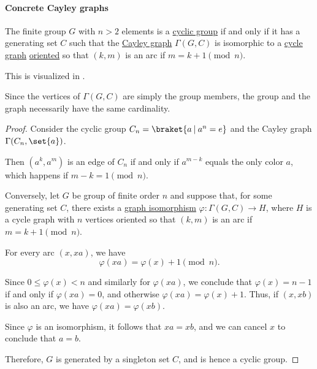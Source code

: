 \paragraph{Concrete Cayley graphs}

\begin{proposition}\label{thm:cayley_graph_of_finite_cyclic_group}
  The finite group \( G \) with \( n > 2 \) elements is a \hyperref[def:cyclic_group]{cyclic group} if and only if it has a generating set \( C \) such that the \hyperref[def:cayley_graph]{Cayley graph} \( \Gamma(G, C) \) is isomorphic to a \hyperref[def:cycle_graph]{cycle graph} \hyperref[def:multigraph_orientation]{oriented} so that \( (k, m) \) is an arc if \( m = k + 1 \pmod n \).
\end{proposition}
\begin{comments}
  \item This is visualized in .
  \item Since the vertices of \( \Gamma(G, C) \) are simply the group members, the group and the graph necessarily have the same cardinality.
\end{comments}
\begin{proof}
  \SufficiencySubProof Consider the cyclic group \( C_n = \braket{ a \given a^n = e } \) and the Cayley graph \( \Gamma(C_n, \set{ a }) \).

  Then \( (a^k, a^m) \) is an edge of \( C_n \) if and only if \( a^{m - k} \) equals the only color \( a \), which happens if \( m - k = 1 \pmod n \).

  \NecessitySubProof Conversely, let \( G \) be group of finite order \( n \) and suppose that, for some generating set \( C \), there exists a \hyperref[def:directed_graph/homomorphism]{graph isomorphism} \( \varphi: \Gamma(G, C) \to H \), where \( H \) is a cycle graph with \( n \) vertices oriented so that \( (k, m) \) is an arc if \( m = k + 1 \pmod n \).

  For every arc \( (x, xa) \), we have
  \begin{equation*}
    \varphi(xa) = \varphi(x) + 1 \pmod n.
  \end{equation*}

  Since \( 0 \leq \varphi(x) < n \) and similarly for \( \varphi(xa) \), we conclude that \( \varphi(x) = n - 1 \) if and only if \( \varphi(xa) = 0 \), and otherwise \( \varphi(xa) = \varphi(x) + 1 \). Thus, if \( (x, xb) \) is also an arc, we have \( \varphi(xa) = \varphi(xb) \).

  Since \( \varphi \) is an isomorphism, it follows that \( xa = xb \), and we can cancel \( x \) to conclude that \( a = b \).

  Therefore, \( G \) is generated by a singleton set \( C \), and is hence a cyclic group.
\end{proof}

